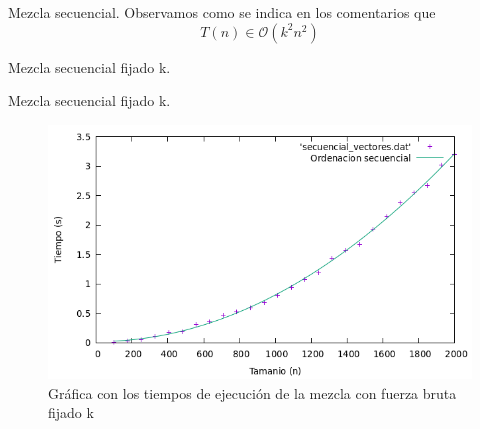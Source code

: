 \documentclass[10pt, xcolor=table]{beamer}
\begin{document}
\begin{frame}[fragile]{Mezcla secuencial. }
Observamos como se indica en los comentarios que 
\[
	T(n) \in \mathcal{O}(k^2n^2)
\]
\end{frame}


\begin{frame}[fragile]{Mezcla secuencial fijado k. }
	\begin{table}[h!]
		\centering
		\footnotesize
		\caption{Experiencia empírica de la mezcla con fuerza bruta fijado k}
	\end{table}
\end{frame}


\begin{frame}[fragile]{Mezcla secuencial fijado k. }
\begin{figure}[h!]
	\centering
	\includegraphics[scale=0.45]{./Images/Grafica_eje2_fijoksec.png}
	\caption{Gráfica con los tiempos de ejecución de la mezcla con fuerza bruta fijado k}
\end{figure}
\end{frame}
\end{document}
